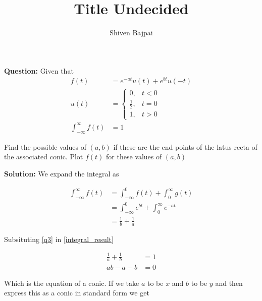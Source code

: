 \documentclass[journal]{IEEEtran}
\begin{document}
\onecolumn

\vspace{3cm}

\renewcommand{\thetable}{\theenumi}

\title{Title Undecided}
\author{Shiven Bajpai}
\maketitle

\renewcommand{\thetable}{\theenumi} 

\setcounter{section}{1}
\textbf{Question: } Given that
\begin{align}
	f(t) &= e^{-at}u(t) + e^{bt}u(-t) \label{q1}\\
	u(t) &= \begin{cases}
		0, & t<0\\
		\frac{1}{2}, & t=0 \\
		1, & t>0
	\end{cases} \label{q2}\\
	\int_{-\infty}^{\infty} f(t) &= 1 \label{q3}
\end{align}

Find the possible values of $(a,b)$ if these are the end points of the latus recta of the associated conic. Plot $f(t)$ for these values of $(a,b)$

\bigskip

\textbf{Solution: } We expand the integral as 

\begin{align}
	\int_{-\infty}^{\infty} f(t) &= \int_{-\infty}^{0} f(t) + \int_{0}^{\infty} g(t)\\
	&= \int_{-\infty}^{0} e^{bt} + \int_{0}^{\infty} e^{-at}\\
	&= \frac{1}{b} + \frac{1}{a} \label{integral_result}
\end{align}

Subsituting \eqref{q3} in \eqref{integral_result}

\begin{align}
	\frac{1}{a} + \frac{1}{b} &= 1\\
	ab - a - b &= 0 \label{conic_ab}
\end{align}

Which is the equation of a conic. 
If we take $a$ to be $x$ and $b$ to be $y$ and then express this as a conic in standard form we get
\end{document}
